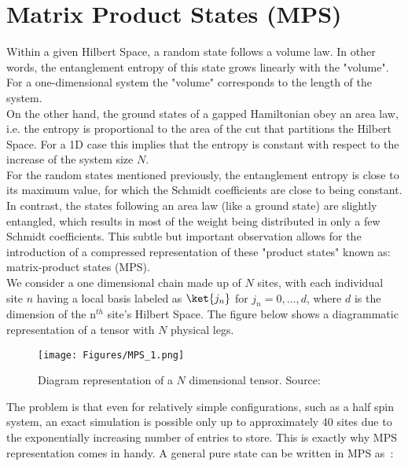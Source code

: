 \section{Matrix Product States (MPS)}


Within a given Hilbert Space, a random state follows a volume law.
In other words, the entanglement entropy of this state grows linearly with the "volume".
For a one-dimensional system the "volume" corresponds to the length of the system. \\

On the other hand, the ground states of a gapped Hamiltonian obey an area law, i.e. the entropy is proportional to the area of the cut that partitions the Hilbert Space.
For a 1D case this implies that the entropy is constant with respect to the increase of the system size $N$. \\

For the random states mentioned previously, the entanglement entropy is close to its maximum value, for which the Schmidt coefficients are close to being constant.
In contrast, the states following an area law (like a ground state) are slightly entangled, which results in most of the weight being distributed in only a few Schmidt coefficients.
This subtle but important observation allows for the introduction of a compressed representation of these "product states" known as: 
matrix-product states (MPS).\\

We consider a one dimensional chain made up of $N$ sites, with each individual site $n$ having a local basis labeled as $\ket{j_n}$ for $j_n = 0, \dots, d$, where $d$ is the dimension of the n$^{th}$ site's Hilbert Space.
The figure below shows a diagrammatic representation of a tensor with $N$ physical legs.

\begin{figure}[h!]
    \centering
    \texttt{[image: Figures/MPS\_1.png]}
    \caption{Diagram representation of a $N$ dimensional tensor. Source: \cite{anleitung}}
    \label{fig:mps-1}
\end{figure}

The problem is that even for relatively simple configurations, such as a half spin system, an exact simulation is possible only up to approximately 40 sites \cite{anleitung} due to the exponentially increasing number of entries to store.
This is exactly why MPS representation comes in handy.
A general pure state can be written in MPS as~\cite{anleitung}:

